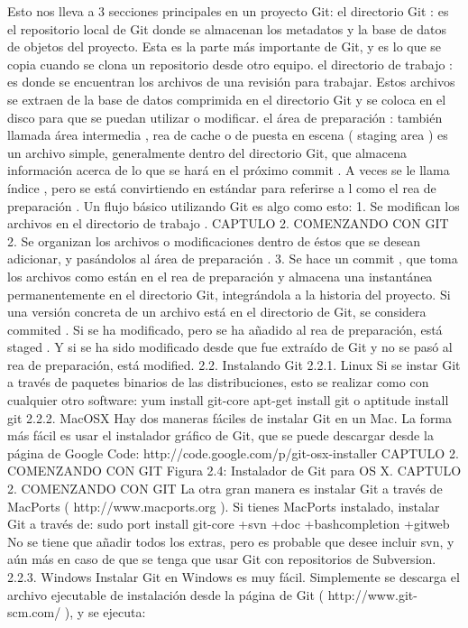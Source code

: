 \documentclass[12pt, spanish, oneside, onecolumn, a4paper]{report}
\begin{document}
Esto nos lleva a 3 secciones principales en un proyecto Git:
el directorio Git : es el repositorio local de Git donde se almacenan los metadatos y la base de datos de objetos del proyecto. Esta es la parte más importante de Git, y es lo que se copia cuando se clona un repositorio desde otro equipo.
el directorio de trabajo : es donde se encuentran los archivos de una revisión para trabajar. Estos archivos se extraen de la base de datos comprimida en el directorio Git y se coloca en el disco para que se puedan utilizar o modificar.
el área de preparación : también llamada área intermedia , rea de cache o de puesta en escena ( staging area ) es un archivo simple, generalmente dentro del directorio Git, que almacena información acerca de lo que se hará en el próximo commit . A veces se le llama  índice , pero se está convirtiendo en estándar para referirse a l como el rea de preparación .
Un flujo básico utilizando Git es algo como esto:
1. Se modifican los archivos en el directorio de trabajo .
 CAPTULO 2. COMENZANDO CON GIT 2. Se organizan los archivos o modificaciones dentro de éstos que se desean adicionar, y pasándolos al área de preparación .
3. Se hace un commit , que toma los archivos como están en el rea de preparación y almacena una instantánea permanentemente en el directorio Git, integrándola a la historia del proyecto.
Si una versión concreta de un archivo está en el directorio de Git, se considera commited . Si se ha modificado, pero se ha añadido al rea de preparación, está staged . Y si se ha sido modificado desde que fue extraído de Git y no se pasó al rea de preparación, está modified.
2.2. Instalando Git
2.2.1. Linux
Si se instar Git a través de paquetes binarios de las distribuciones, esto se realizar como con cualquier otro software:
 yum install git-core
 apt-get install git
o
 aptitude install git
2.2.2. MacOSX
Hay dos maneras fáciles de instalar Git en un Mac. La forma más fácil es usar el instalador gráfico de Git, que se puede descargar desde la página de Google Code:
http://code.google.com/p/git-osx-installer
 CAPTULO 2. COMENZANDO CON GIT Figura 2.4: Instalador de Git para OS X.
 CAPTULO 2. COMENZANDO CON GIT La otra gran manera es instalar Git a través de MacPorts ( http://www.macports.org ). Si tienes MacPorts instalado, instalar Git a través de:
 sudo port install git-core +svn +doc +bashcompletion +gitweb
No se tiene que añadir todos los extras, pero es probable que desee incluir svn, y aún más en caso de que se tenga que usar Git con repositorios de Subversion.
2.2.3. Windows
Instalar Git en Windows es muy fácil. Simplemente se descarga el archivo ejecutable de instalación desde la página de Git ( http://www.git-scm.com/ ), y se ejecuta:
\end{document}
